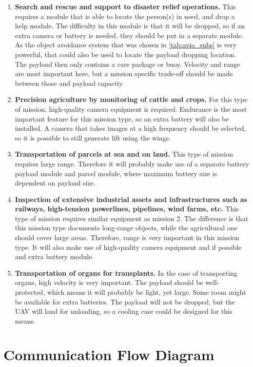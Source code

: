 \begin{enumerate}
\item	\textbf{Search and rescue and support to disaster relief operations.} This requires a module that is able to locate the person(s) in need, and drop a help module. The difficulty in this module is that it will be dropped, so if an extra camera or battery is needed, they should be put in a separate module. As the object avoidance system that was chosen in \autoref{tab:avio_subs} is very powerful, that could also be used to locate the payload dropping location. The payload then only contains a care package or buoy. Velocity and range are most important here, but a mission specific trade-off should be made between those and payload capacity.
\item	\textbf{Precision agriculture by monitoring of cattle and crops.} For this type of mission, high-quality camera equipment is required. Endurance is the most important feature for this mission type, so an extra battery will also be installed. A camera that takes images at a high frequency should be selected, so it is possible to still generate lift using the wings.
\item \textbf{Transportation of parcels at sea and on land.} This type of mission requires large range. Therefore it will probably make use of a separate battery payload module and parcel module, where maximum battery size is dependent on payload size.
\item \textbf{Inspection of extensive industrial assets and infrastructures such as railways, high-tension powerlines, pipelines, wind farms, etc.} This type of mission requires similar equipment as mission 2. The difference is that this mission type documents long-range objects, while the agricultural one should cover large areas. Therefore, range is very important in this mission type. It will also make use of high-quality camera equipment and if possible and extra battery module.
\item 	\textbf{Transportation of organs for transplants.} In the case of transporting organs, high velocity is very important. The payload should be well-protected, which means it will probably be light, yet large. Some room might be available for extra batteries. The payload will not be dropped, but the UAV will land for unloading, so a cooling case could be designed for this means.
\end{enumerate}


\section{Communication Flow Diagram}
\label{sec:comm_flow_diag}

